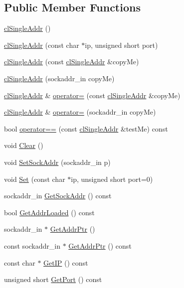 \subsection*{Public Member Functions}
\begin{DoxyCompactItemize}
\item 
\hyperlink{classcl_single_addr_a25fc96ad0476627e7b22a2a365bb3a11}{clSingleAddr} ()
\item 
\hyperlink{classcl_single_addr_a1c90930c18459af48353cc898dcb729e}{clSingleAddr} (const char $\ast$ip, unsigned short port)
\item 
\hyperlink{classcl_single_addr_a36970eb1b9cc4914dd843db90196d006}{clSingleAddr} (const \hyperlink{classcl_single_addr}{clSingleAddr} \&copyMe)
\item 
\hyperlink{classcl_single_addr_a43525548c2d43e84022ea1827ac82a07}{clSingleAddr} (sockaddr\_\-in copyMe)
\item 
\hyperlink{classcl_single_addr}{clSingleAddr} \& \hyperlink{classcl_single_addr_a10927da2ddc85b5c2be6c90adfc9152b}{operator=} (const \hyperlink{classcl_single_addr}{clSingleAddr} \&copyMe)
\item 
\hyperlink{classcl_single_addr}{clSingleAddr} \& \hyperlink{classcl_single_addr_a0f4348bd70156efdd584e00a0adc2e62}{operator=} (sockaddr\_\-in copyMe)
\item 
bool \hyperlink{classcl_single_addr_afe5dc8744dfa7e40c5a2883dd9174f0b}{operator==} (const \hyperlink{classcl_single_addr}{clSingleAddr} \&testMe) const 
\item 
void \hyperlink{classcl_single_addr_a4b221008868bbbe41913e2df9d0be148}{Clear} ()
\item 
void \hyperlink{classcl_single_addr_a0b6f53364da19bf3a32e858eacf8224e}{SetSockAddr} (sockaddr\_\-in p)
\item 
void \hyperlink{classcl_single_addr_a6840625e03f2d6cef1f2879fbdc797ac}{Set} (const char $\ast$ip, unsigned short port=0)
\item 
sockaddr\_\-in \hyperlink{classcl_single_addr_ab330c7465bfaadaa20dc47cf229562c4}{GetSockAddr} () const 
\item 
bool \hyperlink{classcl_single_addr_af08c879a9ccf9e1911ce1eb987954274}{GetAddrLoaded} () const 
\item 
sockaddr\_\-in $\ast$ \hyperlink{classcl_single_addr_a826fb99a2fc5b2d792dc3c9bc4cd0d6c}{GetAddrPtr} ()
\item 
const sockaddr\_\-in $\ast$ \hyperlink{classcl_single_addr_ab96f6dd987c9bd363a8fc16c3c3faba2}{GetAddrPtr} () const 
\item 
const char $\ast$ \hyperlink{classcl_single_addr_a1238a7dec32e132dfd4b25842ea67d61}{GetIP} () const 
\item 
unsigned short \hyperlink{classcl_single_addr_a2cb9bf087e9374b61f0ed8c37df35a79}{GetPort} () const 
\end{DoxyCompactItemize}
